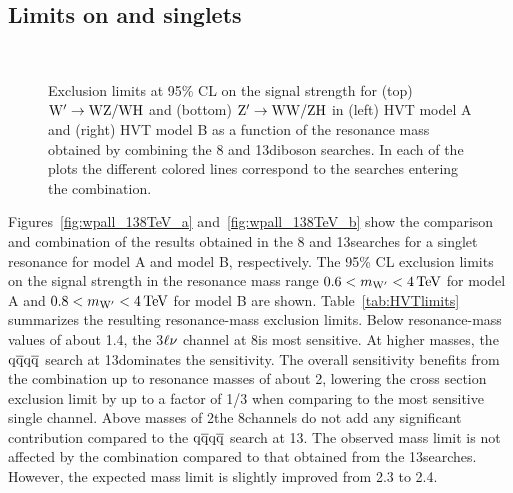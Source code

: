 \subsection{Limits on \Wpr and \Zpr singlets}

\begin{figure}[!htb]
\centering
{}
\\
\caption{%
Exclusion limits at 95\% CL on the signal strength for (top) $\mathrm{W}^\prime\to\mathrm{W}\mathrm{Z}/\mathrm{W}\mathrm{H}$ and (bottom) $\mathrm{Z}^\prime\to\mathrm{W}\mathrm{W}/\mathrm{Z}\mathrm{H}$ in (left) HVT model A and (right) HVT model B as a function of the resonance mass obtained by combining the 8 and 13\TeV diboson searches. In each of the plots the different colored lines correspond to the searches entering the combination.}
\label{fig:wpall_138TeV}
\end{figure}

Figures~\ref{fig:wpall_138TeV_a} and~\ref{fig:wpall_138TeV_b} show the comparison and combination of the results obtained in the 8 and 13\TeV searches for a \Wpr singlet resonance for model A and model B, respectively.
The 95\% CL exclusion limits on the signal strength in the resonance mass range $0.6 < m_{\mathrm{W}^\prime} < 4\,\text{Te\hspace{-.08em}V}$ for model A and $0.8 < m_{\mathrm{W}^\prime} < 4\,\text{Te\hspace{-.08em}V}$ for model B are shown.
Table~\ref{tab:HVTlimits} summarizes the resulting resonance-mass exclusion limits.
Below resonance-mass values of about 1.4\TeV, the 3$\ell\nu$ channel at 8\TeV is most sensitive.
At higher masses, the $\mathrm{q}\overline{\mathrm{q}}\mathrm{q}\overline{\mathrm{q}}$ search at 13\TeV dominates the sensitivity.
The overall sensitivity benefits from the combination up to resonance masses of about 2\TeV, lowering the cross section exclusion limit by up to a factor of 1/3 when comparing to the most sensitive single channel.
Above masses of 2\TeV the 8\TeV channels do not add any significant contribution compared to the $\mathrm{q}\overline{\mathrm{q}}\mathrm{q}\overline{\mathrm{q}}$ search at 13\TeV.
The observed mass limit is not affected by the combination compared to that obtained from the 13\TeV searches.
However, the expected mass limit is slightly improved from 2.3 to 2.4\TeV.

